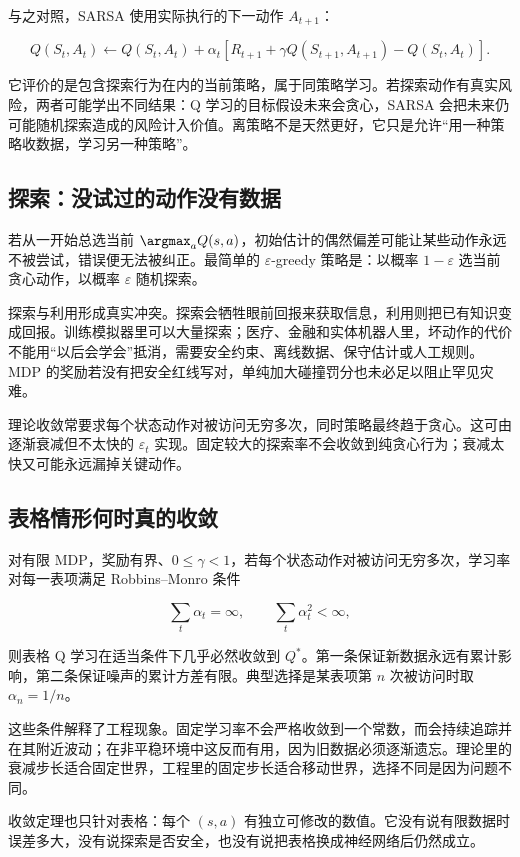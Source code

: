 与之对照，SARSA 使用实际执行的下一动作 \(A_{t+1}\)：

\[
Q(S_t,A_t)
\leftarrow
Q(S_t,A_t)
+\alpha_t
\left[
R_{t+1}+\gamma Q(S_{t+1},A_{t+1})-Q(S_t,A_t)
\right].
\]

它评价的是包含探索行为在内的当前策略，属于同策略学习。若探索动作有真实风险，两者可能学出不同结果：Q 学习的目标假设未来会贪心，SARSA 会把未来仍可能随机探索造成的风险计入价值。离策略不是天然更好，它只是允许``用一种策略收数据，学习另一种策略''。

\subsection{探索：没试过的动作没有数据}

若从一开始总选当前 \(\argmax_aQ(s,a)\)，初始估计的偶然偏差可能让某些动作永远不被尝试，错误便无法被纠正。最简单的 \(\varepsilon\)-greedy 策略是：以概率 \(1-\varepsilon\) 选当前贪心动作，以概率 \(\varepsilon\) 随机探索。

探索与利用形成真实冲突。探索会牺牲眼前回报来获取信息，利用则把已有知识变成回报。训练模拟器里可以大量探索；医疗、金融和实体机器人里，坏动作的代价不能用``以后会学会''抵消，需要安全约束、离线数据、保守估计或人工规则。MDP 的奖励若没有把安全红线写对，单纯加大碰撞罚分也未必足以阻止罕见灾难。

理论收敛常要求每个状态动作对被访问无穷多次，同时策略最终趋于贪心。这可由逐渐衰减但不太快的 \(\varepsilon_t\) 实现。固定较大的探索率不会收敛到纯贪心行为；衰减太快又可能永远漏掉关键动作。

\subsection{表格情形何时真的收敛}

对有限 MDP，奖励有界、\(0\le\gamma<1\)，若每个状态动作对被访问无穷多次，学习率对每一表项满足 Robbins--Monro 条件

\[
\sum_t\alpha_t=\infty,
\qquad
\sum_t\alpha_t^2<\infty,
\]

则表格 Q 学习在适当条件下几乎必然收敛到 \(Q^*\)。第一条保证新数据永远有累计影响，第二条保证噪声的累计方差有限。典型选择是某表项第 \(n\) 次被访问时取 \(\alpha_n=1/n\)。

这些条件解释了工程现象。固定学习率不会严格收敛到一个常数，而会持续追踪并在其附近波动；在非平稳环境中这反而有用，因为旧数据必须逐渐遗忘。理论里的衰减步长适合固定世界，工程里的固定步长适合移动世界，选择不同是因为问题不同。

收敛定理也只针对表格：每个 \((s,a)\) 有独立可修改的数值。它没有说有限数据时误差多大，没有说探索是否安全，也没有说把表格换成神经网络后仍然成立。

